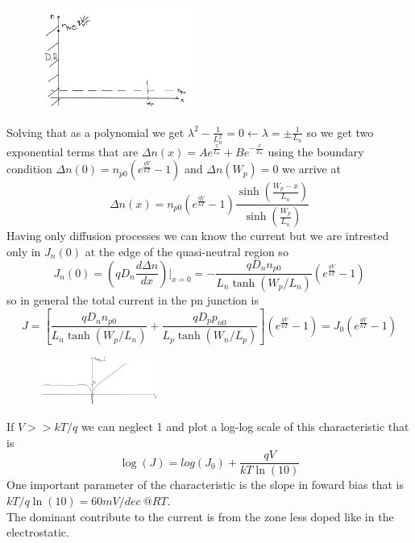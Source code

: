 \begin{figure}
\includegraphics[width=0.45\textwidth]{pn10.png}
\end{figure}

Solving that as a polynomial we get $\lambda^2-\frac{1}{L_n^2}=0\leftarrow \lambda=\pm\frac{1}{L_n}$ so we get two exponential terms that are $\Delta n(x)=Ae^{\frac{x}{L_n}}+Be^{-\frac{x}{L_n}}$ using the boundary condition $\Delta n(0)=n_{p0}(e^{\frac{qV}{kT}}-1)$ and $\Delta n(W_p)=0$ we arrive at
\begin{equation}
\Delta n(x)=n_{p0}(e^{\frac{qV}{kT}}-1)\frac{\sinh(\frac{W_p-x}{L_n})}{\sinh(\frac{W_p}{L_n})}
\end{equation}
Having only diffusion processes we can know the current but we are intrested only in $J_n(0)$ at the edge of the quasi-neutral region so 
\begin{equation}
J_n(0)=(qD_n \frac{d\Delta n}{dx})|_{x=0}=-\frac{qD_nn_{p0}}{L_n\tanh(W_p/L_n)}(e^{\frac{qV}{kT}}-1)
\end{equation}
so in general the total current in the pn junction is 
\begin{equation}
J=[\frac{qD_nn_{p0}}{L_n\tanh(W_p/L_n)}+\frac{qD_pp_{n0}}{L_p\tanh(W_n/L_p)}](e^{\frac{qV}{kT}}-1)=J_0(e^{\frac{qV}{kT}}-1)
\end{equation}

\begin{figure}
\includegraphics[width=0.35\textwidth]{pn11.png}
\end{figure}


If $V>>kT/q$ we can neglect 1 and plot a log-log scale of this characteristic that is 
\begin{equation}
\log(J)=log(J_0)+\frac{qV}{kT\ln(10)}
\end{equation}
One important parameter of the characteristic is the slope in foward bias that is $kT/q \ln(10)=60mV/dec \ @RT$.\\
The dominant contribute to the current is from the zone less doped like in the electrostatic.\\

